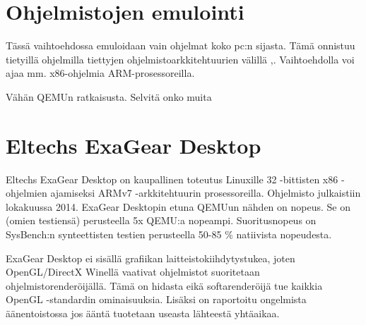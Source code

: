 \section{Ohjelmistojen emulointi}

Tässä vaihtoehdossa emuloidaan vain ohjelmat koko pc:n sijasta. Tämä onnistuu tietyillä ohjelmilla tiettyjen ohjelmistoarkkitehtuurien välillä \cite{tinycc},\cite{qemu_use}. Vaihtoehdolla voi ajaa mm. x86-ohjelmia ARM-prosessoreilla.

Vähän QEMUn ratkaisusta. Selvitä onko muita
\lipsum[7]

\section{Eltechs ExaGear Desktop}
Eltechs ExaGear Desktop on kaupallinen toteutus Linuxille 32 -bittisten x86 -ohjelmien ajamiseksi ARMv7 -arkkitehtuurin prosessoreilla. Ohjelmisto julkaistiin lokakuussa 2014. ExaGear Desktopin etuna QEMUun nähden on nopeus. Se on (omien testiensä) perusteella 5x QEMU:a nopeampi. Suoritusnopeus on SysBench:n synteettisten testien perusteella 50-85 \% natiivista nopeudesta.

ExaGear Desktop ei sisällä grafiikan laitteistokiihdytystukea, joten OpenGL/DirectX Winellä vaativat ohjelmistot suoritetaan ohjelmistorenderöijällä. Tämä on hidasta eikä softarenderöijä tue kaikkia OpenGL -standardin ominaisuuksia. Lisäksi on raportoitu ongelmista äänentoistossa jos ääntä tuotetaan useasta lähteestä yhtäaikaa.

